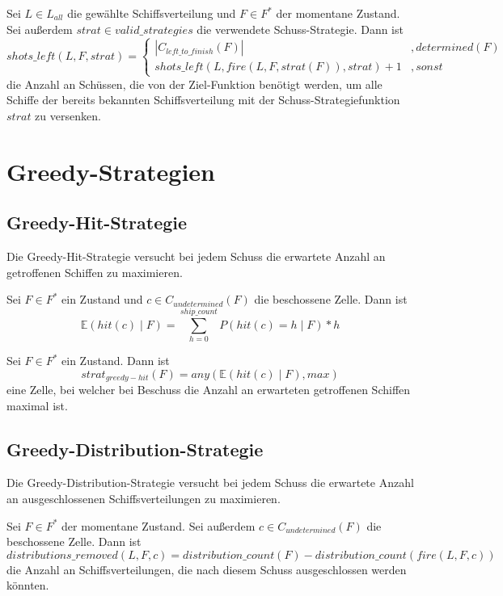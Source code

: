 \documentclass[a4paper,12pt]{llncs}
\numberwithin{equation}{section}
\begin{document}
\begin{definition}
Sei $L\in L_{all}$ die gewählte Schiffsverteilung und $F\in F^*$ der momentane Zustand.
Sei außerdem $strat \in valid\_strategies$ die verwendete Schuss-Strategie.
Dann ist
\[
shots\_left(L, F, strat)=
  \begin{cases} 
  	|C_{left\_to\_finish}(F)|& ,determined(F) \\
      shots\_left(L, fire(L, F, strat(F)), strat) + 1 & ,sonst
   \end{cases}
\]
die Anzahl an Schüssen, die von der Ziel-Funktion benötigt werden, um alle Schiffe der bereits bekannten Schiffsverteilung mit der Schuss-Strategiefunktion $strat$ zu versenken.
\end{definition}

\section{Greedy-Strategien}

\subsection{Greedy-Hit-Strategie}
Die Greedy-Hit-Strategie versucht bei jedem Schuss die erwartete Anzahl an getroffenen Schiffen zu maximieren.

\begin{definition}
Sei $F\in F^*$ ein Zustand und $c \in C_{undetermined}(F)$ die beschossene Zelle.
Dann ist
\[
\mathds{E}(hit(c) \mid F)=\sum_{h=0}^{ship\_count} P(hit(c)=h \mid F) * h
\]
\end{definition}

\begin{definition}
Sei $F\in F^*$ ein Zustand.
Dann ist
\[
strat_{greedy-hit}(F)=any(\mathds{E}(hit(c) \mid F), max)
\]
eine Zelle, bei welcher bei Beschuss die Anzahl an erwarteten getroffenen Schiffen maximal ist.
\end{definition}

\subsection{Greedy-Distribution-Strategie}
Die Greedy-Distribution-Strategie versucht bei jedem Schuss die erwartete Anzahl an ausgeschlossenen Schiffsverteilungen zu maximieren.

\begin{definition}
Sei $F\in F^*$ der momentane Zustand.
Sei außerdem $c \in C_{undetermined}(F)$ die beschossene Zelle.
Dann ist
\[
distributions\_removed(L, F, c)=distribution\_count(F) - distribution\_count(fire(L, F,c))
\]
die Anzahl an Schiffsverteilungen, die nach diesem Schuss ausgeschlossen werden könnten.
\end{definition}
\end{document}
